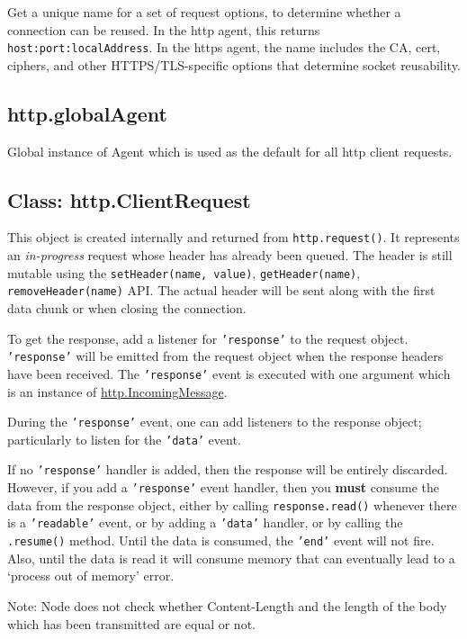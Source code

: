 Get a unique name for a set of request options, to determine whether a
connection can be reused. In the http agent, this returns
\texttt{host:port:localAddress}. In the https agent, the name includes
the CA, cert, ciphers, and other HTTPS/TLS-specific options that
determine socket reusability.

\subsection{http.globalAgent}\label{http.globalagent}

Global instance of Agent which is used as the default for all http
client requests.

\subsection{Class: http.ClientRequest}\label{class-http.clientrequest}

This object is created internally and returned from
\texttt{http.request()}. It represents an \emph{in-progress} request
whose header has already been queued. The header is still mutable using
the \texttt{setHeader(name, value)}, \texttt{getHeader(name)},
\texttt{removeHeader(name)} API. The actual header will be sent along
with the first data chunk or when closing the connection.

To get the response, add a listener for \texttt{'response'} to the
request object. \texttt{'response'} will be emitted from the request
object when the response headers have been received. The
\texttt{'response'} event is executed with one argument which is an
instance of
\hyperref[httpux5fhttpux5fincomingmessage]{http.IncomingMessage}.

During the \texttt{'response'} event, one can add listeners to the
response object; particularly to listen for the \texttt{'data'} event.

If no \texttt{'response'} handler is added, then the response will be
entirely discarded. However, if you add a \texttt{'response'} event
handler, then you \textbf{must} consume the data from the response
object, either by calling \texttt{response.read()} whenever there is a
\texttt{'readable'} event, or by adding a \texttt{'data'} handler, or by
calling the \texttt{.resume()} method. Until the data is consumed, the
\texttt{'end'} event will not fire. Also, until the data is read it will
consume memory that can eventually lead to a `process out of memory'
error.

Note: Node does not check whether Content-Length and the length of the
body which has been transmitted are equal or not.

